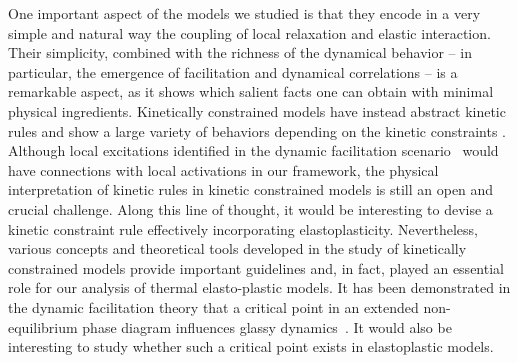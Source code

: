 \documentclass[pre,twocolumn,superscriptaddress,tightenlines,showpacs,longbibliography,floatfix,footinbib]{revtex4-1}
\begin{document}
One important aspect of the models we studied is that they encode in a very simple and natural way the coupling of local relaxation and elastic interaction. Their simplicity, combined with the richness of the dynamical behavior -- in particular, the emergence of facilitation and dynamical correlations -- is a remarkable aspect, as it shows which salient facts one can obtain with minimal physical ingredients. 
Kinetically constrained models have instead abstract kinetic rules and show a large variety of behaviors depending on the kinetic constraints \cite{ritort2003glassy}. Although local excitations identified in the dynamic facilitation scenario~\cite{isobe2016applicability,keys2011excitations} would have connections with local activations in our framework, the physical interpretation of kinetic rules in kinetic constrained models is still an open and crucial challenge. Along this line of thought, it would be interesting to devise a kinetic constraint rule effectively incorporating elastoplasticity.
Nevertheless, various concepts and theoretical tools developed in the study of kinetically constrained models provide important guidelines and, in fact, played an essential role for our analysis of thermal elasto-plastic models.
It has been demonstrated in the dynamic facilitation theory that a critical point in an extended non-equilibrium phase diagram influences glassy dynamics~\cite{elmatad2010finite,turci2017nonequilibrium}. It would also be interesting to study whether such a critical point exists in elastoplastic models.
\end{document}
